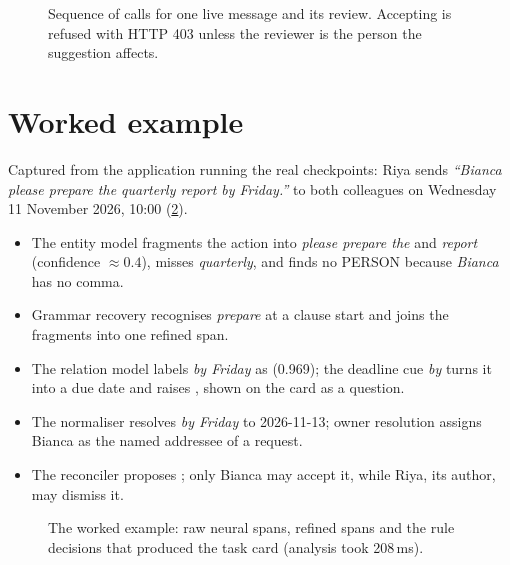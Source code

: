 \begin{figure}[htbp]
\centering
{}
\caption{Sequence of calls for one live message and its review. Accepting is refused with HTTP 403 unless the reviewer is the person the suggestion affects.}
\label{fig:sequence}
\end{figure}

\section{Worked example}
\label{sec:walkthrough}
Captured from the application running the real checkpoints: Riya sends \emph{``Bianca please prepare the quarterly report by Friday.''} to both colleagues on Wednesday 11 November 2026, 10:00 (\cref{fig:exlive}).
\begin{itemize}
  \item The entity model fragments the action into \emph{please prepare the} and \emph{report} (confidence $\approx0.4$), misses \emph{quarterly}, and finds no PERSON because \emph{Bianca} has no comma.
  \item Grammar recovery recognises \emph{prepare} at a clause start and joins the fragments into one refined span.
  \item The relation model labels \emph{by Friday} as  (0.969); the deadline cue \emph{by} turns it into a due date and raises , shown on the card as a question.
  \item The normaliser resolves \emph{by Friday} to 2026-11-13; owner resolution assigns Bianca as the named addressee of a request.
  \item The reconciler proposes ; only Bianca may accept it, while Riya, its author, may dismiss it.
\end{itemize}

\begin{figure}[htbp]
\centering
{}
\caption{The worked example: raw neural spans, refined spans and the rule decisions that produced the task card (analysis took 208\,ms).}
\label{fig:exlive}
\end{figure}


